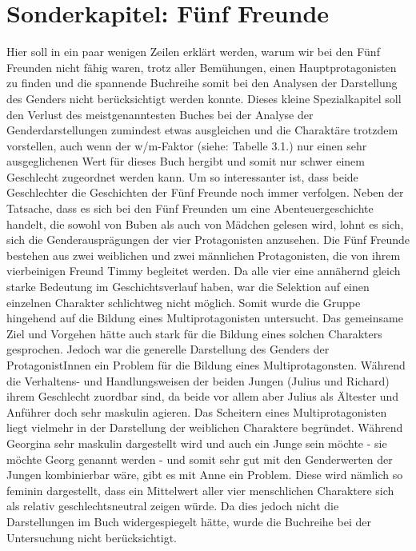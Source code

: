 \section{Sonderkapitel: Fünf Freunde}

Hier soll in ein paar wenigen Zeilen erklärt werden, warum wir bei den
Fünf Freunden nicht fähig waren, trotz aller Bemühungen, einen
Hauptprotagonisten zu finden und die spannende Buchreihe somit bei den
Analysen der Darstellung des Genders nicht berücksichtigt werden konnte.
Dieses kleine Spezialkapitel soll den Verlust des meistgenanntesten
Buches bei der Analyse der Genderdarstellungen zumindest etwas
ausgleichen und die Charaktäre trotzdem vorstellen, auch wenn der
w/m-Faktor (siehe: Tabelle 3.1.) nur einen sehr ausgeglichenen Wert für
dieses Buch hergibt und somit nur schwer einem Geschlecht zugeordnet
werden kann. Um so interessanter ist, dass beide Geschlechter die
Geschichten der Fünf Freunde noch immer verfolgen. Neben der Tatsache,
dass es sich bei den Fünf Freunden um eine Abenteuergeschichte handelt,
die sowohl von Buben als auch von Mädchen gelesen wird, lohnt es sich,
sich die Genderausprägungen der vier Protagonisten anzusehen. Die Fünf
Freunde bestehen aus zwei weiblichen und zwei männlichen Protagonisten,
die von ihrem vierbeinigen Freund Timmy begleitet werden. Da alle vier
eine annähernd gleich starke Bedeutung im Geschichtsverlauf haben, war
die Selektion auf einen einzelnen Charakter schlichtweg nicht möglich.
Somit wurde die Gruppe hingehend auf die Bildung eines
Multiprotagonisten untersucht. Das gemeinsame Ziel und Vorgehen hätte
auch stark für die Bildung eines solchen Charakters gesprochen. Jedoch
war die generelle Darstellung des Genders der ProtagonistInnen ein
Problem für die Bildung eines Multiprotagonsten. Während die Verhaltens-
und Handlungsweisen der beiden Jungen (Julius und Richard) ihrem
Geschlecht zuordbar sind, da beide vor allem aber Julius als Ältester
und Anführer doch sehr maskulin agieren. Das Scheitern eines
Multiprotagonisten liegt vielmehr in der Darstellung der weiblichen
Charaktere begründet. Während Georgina sehr maskulin dargestellt wird
und auch ein Junge sein möchte - sie möchte Georg genannt werden - und
somit sehr gut mit den Genderwerten der Jungen kombinierbar wäre, gibt
es mit Anne ein Problem. Diese wird nämlich so feminin dargestellt, dass
ein Mittelwert aller vier menschlichen Charaktere sich als relativ
geschlechtsneutral zeigen würde. Da dies jedoch nicht die Darstellungen
im Buch widergespiegelt hätte, wurde die Buchreihe bei der Untersuchung
nicht berücksichtigt.

